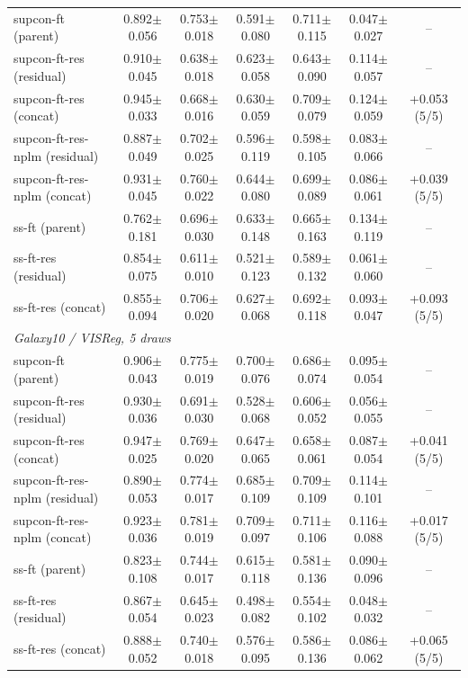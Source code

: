 \begin{landscape}
\begin{center}
\begin{longtable}{lcccccc}
\quad supcon-ft (parent) & 0.892$\pm$0.056 & 0.753$\pm$0.018 & 0.591$\pm$0.080 & 0.711$\pm$0.115 & 0.047$\pm$0.027 & -- \\
\quad supcon-ft-res (residual) & 0.910$\pm$0.045 & 0.638$\pm$0.018 & 0.623$\pm$0.058 & 0.643$\pm$0.090 & 0.114$\pm$0.057 & -- \\
\quad supcon-ft-res (concat) & 0.945$\pm$0.033 & 0.668$\pm$0.016 & 0.630$\pm$0.059 & 0.709$\pm$0.079 & 0.124$\pm$0.059 & +0.053 (5/5) \\
\quad supcon-ft-res-nplm (residual) & 0.887$\pm$0.049 & 0.702$\pm$0.025 & 0.596$\pm$0.119 & 0.598$\pm$0.105 & 0.083$\pm$0.066 & -- \\
\quad supcon-ft-res-nplm (concat) & 0.931$\pm$0.045 & 0.760$\pm$0.022 & 0.644$\pm$0.080 & 0.699$\pm$0.089 & 0.086$\pm$0.061 & +0.039 (5/5) \\
\quad ss-ft (parent) & 0.762$\pm$0.181 & 0.696$\pm$0.030 & 0.633$\pm$0.148 & 0.665$\pm$0.163 & 0.134$\pm$0.119 & -- \\
\quad ss-ft-res (residual) & 0.854$\pm$0.075 & 0.611$\pm$0.010 & 0.521$\pm$0.123 & 0.589$\pm$0.132 & 0.061$\pm$0.060 & -- \\
\quad ss-ft-res (concat) & 0.855$\pm$0.094 & 0.706$\pm$0.020 & 0.627$\pm$0.068 & 0.692$\pm$0.118 & 0.093$\pm$0.047 & +0.093 (5/5) \\
\multicolumn{7}{l}{\emph{Galaxy10 / VISReg, 5 draws}} \\
\quad supcon-ft (parent) & 0.906$\pm$0.043 & 0.775$\pm$0.019 & 0.700$\pm$0.076 & 0.686$\pm$0.074 & 0.095$\pm$0.054 & -- \\
\quad supcon-ft-res (residual) & 0.930$\pm$0.036 & 0.691$\pm$0.030 & 0.528$\pm$0.068 & 0.606$\pm$0.052 & 0.056$\pm$0.055 & -- \\
\quad supcon-ft-res (concat) & 0.947$\pm$0.025 & 0.769$\pm$0.020 & 0.647$\pm$0.065 & 0.658$\pm$0.061 & 0.087$\pm$0.054 & +0.041 (5/5) \\
\quad supcon-ft-res-nplm (residual) & 0.890$\pm$0.053 & 0.774$\pm$0.017 & 0.685$\pm$0.109 & 0.709$\pm$0.109 & 0.114$\pm$0.101 & -- \\
\quad supcon-ft-res-nplm (concat) & 0.923$\pm$0.036 & 0.781$\pm$0.019 & 0.709$\pm$0.097 & 0.711$\pm$0.106 & 0.116$\pm$0.088 & +0.017 (5/5) \\
\quad ss-ft (parent) & 0.823$\pm$0.108 & 0.744$\pm$0.017 & 0.615$\pm$0.118 & 0.581$\pm$0.136 & 0.090$\pm$0.096 & -- \\
\quad ss-ft-res (residual) & 0.867$\pm$0.054 & 0.645$\pm$0.023 & 0.498$\pm$0.082 & 0.554$\pm$0.102 & 0.048$\pm$0.032 & -- \\
\quad ss-ft-res (concat) & 0.888$\pm$0.052 & 0.740$\pm$0.018 & 0.576$\pm$0.095 & 0.586$\pm$0.136 & 0.086$\pm$0.062 & +0.065 (5/5) \\
\end{longtable}
\end{center}
\end{landscape}
